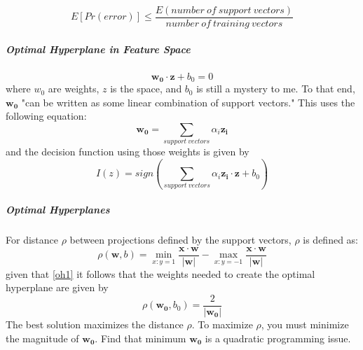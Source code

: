 				\begin{equation} E[Pr(error)] \leq \frac{E(number\ of\ support\ vectors)}{number\ of\ training\ vectors}\end{equation}

				\subparagraph{Optimal Hyperplane in Feature Space}
				\begin{equation}\label{oh1} \mathbf{w_0} \cdot \mathbf{z} + b_0 = 0\end{equation} where $w_0$ are weights, $z$ is the space, and $b_0$ is still a mystery to me.
				To that end, $\mathbf{w_0}$ "can be written as some linear combination of support vectors."  This uses the following equation:
				\begin{equation}\mathbf{w_0} = \sum_{support\ vectors} \alpha_i \mathbf{z_i}\end{equation} and the decision function using those weights is given by
				\begin{equation}I(z) = sign\left(\sum_{support\ vectors} \alpha_i \mathbf{z_i} \cdot \mathbf{z} + b_0\right)\end{equation}

				\subparagraph*{Optimal Hyperplanes}
				For distance $\rho$ between projections defined by the support vectors, $\rho$ is defined as:
				\begin{equation}\rho(\mathbf{w}, b) = \min_{x:y=1} \frac{\mathbf{x} \cdot \mathbf{w}}{ |\mathbf{w}|} - \max_{x:y=-1} \frac{\mathbf{x} \cdot \mathbf{w}}{|\mathbf{w}|}\end{equation}
				given that \eqref{oh1} it follows that the weights needed to create the optimal hyperplane are given by
				\begin{equation}\label{oh2} \rho (\mathbf{w_0}, b_0) = \frac{2}{|\mathbf{w_0}|}\end{equation}  The best solution maximizes the distance $\rho$.  To maximize $\rho$, you must minimize the magnitude of $\mathbf{w_0}$.  Find that minimum $\mathbf{w_0}$ is a quadratic programming issue.

